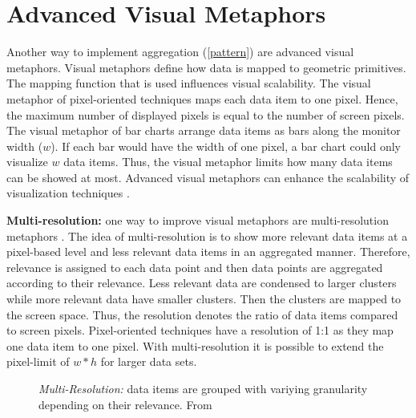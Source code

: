\section{Advanced Visual Metaphors}\label{advancedmetaphor}
Another way to implement aggregation (\ref{pattern}) are advanced visual metaphors. Visual metaphors define how data is mapped to geometric primitives. The mapping function that is used influences visual scalability. The visual metaphor of pixel-oriented techniques maps each data item to one pixel. Hence, the maximum number of displayed pixels is equal to the number of screen pixels. The visual metaphor of bar charts  arrange data items as bars along the monitor width ($w$). If each bar would have the width of one pixel, a bar chart could only visualize  $w$ data items. Thus, the visual metaphor limits how many data items can be showed at most. Advanced visual metaphors can enhance the scalability of visualization techniques  \cite{Eick2002}. \par
 \textbf{Multi-resolution:} \label{multi-resolution} one way to improve visual metaphors are multi-resolution metaphors  \cite{Keim2005}. The idea of multi-resolution is to show more relevant data items at a pixel-based level and less relevant data items in an aggregated manner. Therefore, relevance is assigned to each data point and then data points are aggregated according to their relevance. Less relevant data are condensed to larger clusters while more relevant data have smaller clusters. Then the clusters are mapped to the screen space. Thus, the resolution denotes the ratio of data items compared to screen pixels. Pixel-oriented techniques have a resolution of 1:1 as they map one data item to one pixel. With multi-resolution it is possible to extend the pixel-limit of $w*h$ for larger data sets. 
 \begin{figure}
     \centering
     \caption[Multi-resolution]{\textit{Multi-Resolution: }data items are grouped with variying granularity depending on their relevance. From  \cite{Keim2005}}
     \label{fig:multi-resolution}
 \end{figure}
